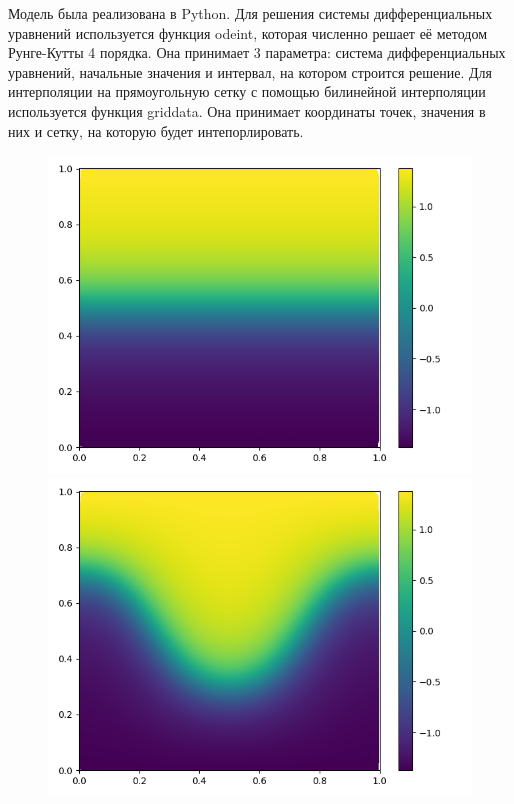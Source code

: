 \documentclass[a4paper, 14pt]{extarticle}
\begin{document}
		Модель была реализована в Python. Для решения системы дифференциальных уравнений используется функция odeint, которая численно решает её методом Рунге-Кутты 4 порядка. Она принимает 3 параметра: система дифференциальных уравнений, начальные значения и интервал, на котором строится решение. Для интерполяции на прямоугольную сетку с помощью билинейной интерполяции используется функция griddata. Она принимает координаты точек, значения в них и сетку, на которую будет интепорлировать.
		\begin{figure}[H]
			\begin{minipage}{0.5\textwidth}
				\centering
				\includegraphics[width = \linewidth]{1.png}
			\end{minipage}\hfill
			\begin{minipage}{0.5\textwidth}
				\centering
				\includegraphics[width = \linewidth]{2.png}
			\end{minipage}\hfill
		\end{figure}
	
\end{document}
